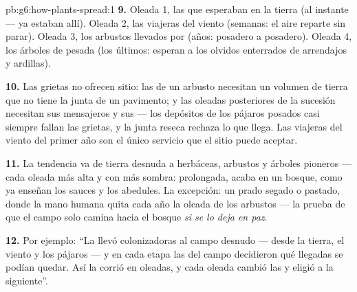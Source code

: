 \begin{solution}{pb:g6:how-plants-spread:1}
\textbf{9.} Oleada 1, las  que esperaban en la tierra (al
instante --- ya estaban allí). Oleada 2, las viajeras del viento
(semanas: el aire reparte sin parar). Oleada 3, los arbustos llevados
por  (años: posadero a posadero). Oleada 4, los árboles de
 pesada (los últimos: esperan a los olvidos enterrados de
arrendajos y ardillas).

\textbf{10.} Las grietas no ofrecen sitio: las  de un arbusto
necesitan un volumen de tierra que no tiene la junta de un pavimento; y
las oleadas posteriores de la sucesión necesitan sus mensajeros y sus
 --- los depósitos de los pájaros posados casi siempre
fallan las grietas, y la junta reseca rechaza lo que llega. Las
viajeras del viento del primer año son el único servicio que el sitio
puede aceptar.

\textbf{11.} La tendencia va de tierra desnuda a herbáceas, arbustos y
árboles pioneros --- cada oleada más alta y con más sombra:
prolongada, acaba en un bosque, como ya enseñan los sauces y los
abedules. La excepción: un prado segado o pastado, donde la mano humana
quita cada año la oleada de los arbustos --- la prueba de que el campo
solo camina hacia el bosque \emph{si se lo deja en paz}.

\textbf{12.} Por ejemplo: ``La  llevó colonizadoras al campo
desnudo --- desde la tierra, el viento y los pájaros --- y en cada
etapa las  del campo decidieron qué llegadas se podían
quedar. Así la  corrió en oleadas, y cada oleada cambió las
 y eligió a la siguiente''.
\end{solution}

